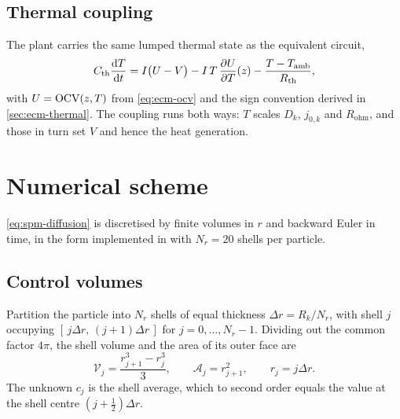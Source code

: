 \subsection{Thermal coupling}
The plant carries the same lumped thermal state as the equivalent circuit,
\begin{equation}
C_{\mathrm{th}}\frac{\mathrm{d}T}{\mathrm{d}t}
 = I\big(U - V\big) - I\,T\,\frac{\partial U}{\partial T}(z)
 - \frac{T-T_{\mathrm{amb}}}{R_{\mathrm{th}}},
\label{eq:spm-thermal}
\end{equation}
with $U = \mathrm{OCV}(z,T)$ from \eqref{eq:ecm-ocv} and the sign convention derived in
\cref{sec:ecm-thermal}. The coupling runs both ways: $T$ scales $D_k$, $j_{0,k}$ and
$R_{\mathrm{ohm}}$, and those in turn set $V$ and hence the heat generation.

\section{Numerical scheme}
\label{sec:spm-numerics}

\eqref{eq:spm-diffusion} is discretised by finite volumes in $r$ and backward Euler in time, in
the form implemented in  with $N_r = 20$ shells per particle.

\subsection{Control volumes}
Partition the particle into $N_r$ shells of equal thickness $\Delta r = R_k/N_r$, with shell $j$
occupying $[\,j\Delta r,\,(j{+}1)\Delta r\,]$ for $j = 0,\dots,N_r-1$. Dividing out the common
factor $4\pi$, the shell volume and the area of its outer face are
\begin{equation}
\mathcal{V}_j = \frac{r_{j+1}^3 - r_j^3}{3},
\qquad
\mathcal{A}_j = r_{j+1}^2,
\qquad r_j = j\Delta r .
\label{eq:spm-volumes}
\end{equation}
The unknown $c_j$ is the shell average, which to second order equals the value at the shell
centre $(j+\tfrac12)\Delta r$.

